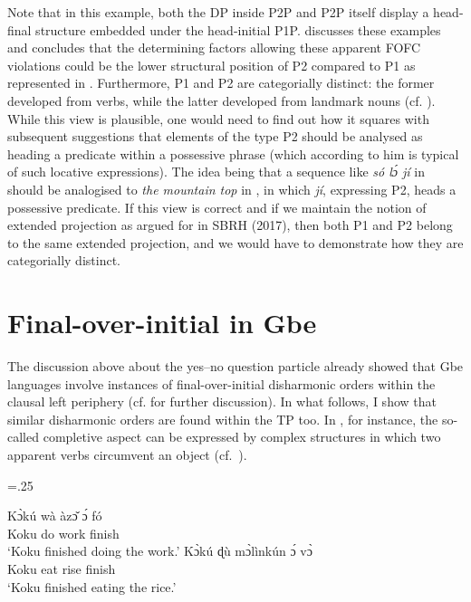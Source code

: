 \documentclass[output=paper]{langsci/langscibook}
\begin{document}
Note that in this example, both the DP inside P2P and P2P itself display a
head-final structure embedded under the head-initial P1P. \citet{Biberauer2016}
discusses these examples and concludes that the determining factors allowing
these apparent \gls{FOFC} violations could be the lower structural position of P2
compared to P1 as represented in . Furthermore, P1 and P2 are
categorially distinct: the former developed from verbs, while the latter
developed from landmark nouns (cf. \citealt{Aboh2010c}). While this view is
plausible, one would need to find out how it squares with 
subsequent suggestions that elements of the type P2 should be analysed as
heading a predicate within a possessive phrase (which according to him is
typical of such locative expressions).  The idea being that a sequence like
\emph{só l\'ɔ jí} in  should be analogised to \emph{the mountain
top} in , in which \emph{jí}, expressing P2, heads a possessive
predicate. If this view is correct and if we maintain the notion of extended
projection as argued for in SBRH (2017), then both P1 and P2 belong to the same
extended projection, and we would have to demonstrate how they are categorially
distinct.

\section{Final-over-initial in Gbe}\largerpage

The discussion above about the yes--no question particle already showed that Gbe
languages involve instances of final-over-initial disharmonic orders within the
clausal left periphery (cf. \citealt{Aboh2016a} for further discussion). In
what follows, I show that similar disharmonic orders are found within the TP
too. In , for instance, the so-called completive aspect can be expressed
by complex structures in which two apparent verbs circumvent an object
(cf.~\citealt{DaCruz1995,Aboh2009,VandenBergAboh2013}).

\ea\label{ex:aboh:14.7}  \parencite[363]{DaCruz1995}
    \multicolsep=.25\baselineskip
    \begin{multicols}{2}
    \ea\label{ex:aboh:14.7a}
        \gll    K\`ɔkú wà àz\v{ɔ} \'ɔ fó \\
                Koku do work \Det{} finish\\
        \glt    \enquote*{Koku finished doing the work.}
    \ex\label{ex:aboh:14.7b}
        \gll    K\`ɔkú ɖù m\`ɔlìnkún \'ɔ v\`ɔ \\
                Koku eat rise \Det{} finish\\
        \glt    \enquote*{Koku finished eating the rice.}
    \z
    \end{multicols}
\z
\end{document}
